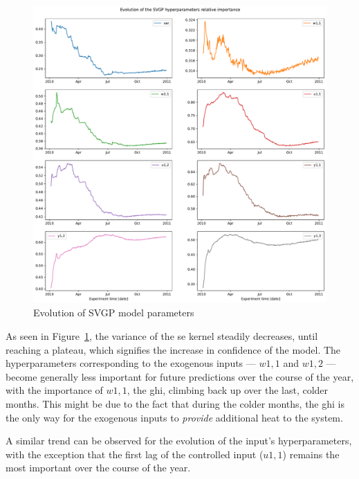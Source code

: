 
\begin{figure}[ht]
    \centering
    \includegraphics[width =
    \textwidth]{Plots/1_SVGP_480pts_inf_window_12_averageYear_evol_importance.pdf}
    \caption{Evolution of SVGP model parameters}
    \label{fig:SVGP_evol_importance}
\end{figure}

As seen in Figure~\ref{fig:SVGP_evol_importance}, the variance of the
\acrshort{se} kernel steadily decreases, until reaching a plateau, which
signifies the increase in confidence of the model. The hyperparameters
corresponding to the exogenous inputs --- $w1,1$ and $w1,2$ --- become generally
less important for future predictions over the course of the year, with the
importance of $w1,1$, the \acrlong{ghi}, climbing back up over the last, colder
months. This might be due to the fact that during the colder months, the
\acrshort{ghi} is the only way for the exogenous inputs to \textit{provide}
additional heat to the system.

A similar trend can be observed for the evolution of the input's
hyperparameters, with the exception that the first lag of the controlled input
($u1,1$) remains the most important over the course of the year.

